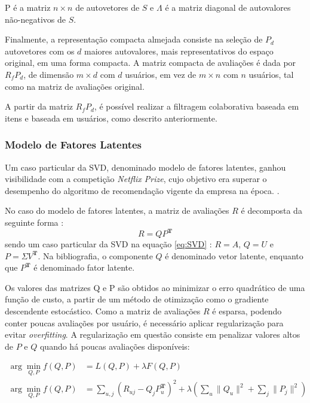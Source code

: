 P é a matriz $n \times n$ de autovetores de $S$ e $\Lambda$ é a matriz diagonal
de autovalores não-negativos de $S$.

Finalmente, a representação compacta almejada consiste na seleção de $P_d$ autovetores com os $d$
maiores autovalores, mais representativos do espaço original, em uma forma compacta.
A matriz compacta de avaliações é dada por $R_{f}P_{d}$, de dimensão $m \times
d$ com $d$ usuários, em vez de $m \times n$ com $n$ usuários, tal como na matriz
de avaliações original.

A partir da matriz $R_{f}P_{d}$, é possível realizar a filtragem colaborativa
baseada em itens e baseada em usuários, como descrito anteriormente.

\subsubsection{Modelo de Fatores Latentes}
Um caso particular da SVD, denominado modelo de fatores latentes, ganhou
visibilidade com a competição \textit{Netflix Prize}, cujo objetivo era superar
o desempenho do algoritmo de recomendação vigente da empresa na época.
\cite{lessons_netflix_prize}.

No caso do modelo de fatores latentes, a matriz de avaliações $R$ é decomposta
da seguinte forma \cite{aggarwal2016recommender}:
\begin{equation}
    R = QP^{\mathbf{T}}
\end{equation}
sendo um caso particular da SVD na equação \ref{eq:SVD} : $R = A$, $Q = U$ e $P = \Sigma V^{\mathbf{T}}$.
Na bibliografia, o componente $Q$ é denominado vetor latente, enquanto que
$P^{\mathbf{T}}$ é denominado fator latente.

Os valores das matrizes Q e P são obtidos ao minimizar o erro quadrático de uma
função de custo, a partir de um método de otimização como o gradiente
descendente estocástico. Como a matriz de avaliações $R$ é esparsa,
podendo conter poucas avaliações por usuário, é necessário aplicar regularização
para evitar \textit{overfitting}. A regularização em questão consiste em
penalizar valores altos de $P$ e $Q$ quando há poucas avaliações disponíveis:

\begin{align}
    \arg\min_{Q,P} f(Q,P) &= L(Q,P) + \lambda F(Q,P) \\
    \arg\min_{Q,P} f(Q,P) &= \sum_{u,j} (R_{uj} - Q_j P_u^{\mathbf{T}})^2 + \lambda (\sum_u \|Q_u\|^2 + \sum_j \|P_j\|^2)
\end{align}

